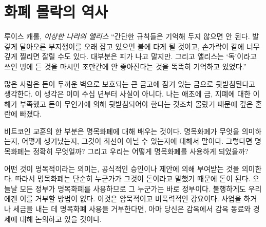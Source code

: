 \chapter{화폐 몰락의 역사}
\label{les:12}

\begin{chapquote}{루이스 캐롤, \textit{이상한 나라의 앨리스}}
	\enquote{간단한 규칙들은 기억해 두지 않으면 안 된다.
		발갛게 달아오른 부지깽이를 오래 잡고 있으면 불에 타게 될 것이고, 
		손가락이 칼에 너무 깊게 찔리면 잘릴 수도 있다. 
		대부분은 피가 나고 말지만. 
		그리고 앨리스는 ‘독’이라고 쓰인 병에 든 것을 마시면 
		조만간에 안 좋아진다는 것을 똑똑히 기억하고 있었다.}
\end{chapquote}

\begin{comment}
	Many people think that money is backed by gold, which is locked away in
	big vaults, protected by thick
	walls. This ceased to be true many decades ago. I am not sure what I
	thought, since I was in much deeper trouble, having virtually no
	understanding of gold, paper money, or why it would need to be backed by
	something in the first place.
\end{comment}
많은 사람은 돈이 두꺼운 벽으로 보호되는 큰 금고에 잠겨 있는 금으로 뒷받침된다고 생각한다. 
이 생각은 이미 수십 년부터 사실이 아니다.
나는 애초에 금, 지폐에 대한 이해가 부족했고
돈이 무언가에 의해 뒷받침되어야 한다는 것조차 몰랐기 때문에 깊은 혼란에 빠졌다.
\begin{comment}
	One part of learning about Bitcoin is learning about fiat money: what it
	means, how it came to be, and why it might not be the best idea we ever
	had. So, what exactly is fiat money? And how did we end up using it?
\end{comment}
비트코인 교훈의 한 부분은 명목화폐에 대해 배우는 것이다. 
명목화폐가 무엇을 의미하는지, 어떻게 생겨났는지, 
그것이 최선이 아닐 수 있는지에 대해서 말이다. 
그렇다면 명목화폐는 정확히 무엇일까? 
그리고 우리는 어떻게 명목화폐를 사용하게 되었을까?

\begin{comment}
	If something is imposed by \textit{fiat}, it simply means that it is imposed by
	formal authorization or proposition. Thus, fiat money is money simply
	because \textit{someone} says that it is money. Since all governments use fiat
	currency today, this someone is \textit{your} government. Unfortunately, you
	are not \textit{free} to disagree with this value proposition. You will quickly
	feel that this proposition is everything but non-violent. If you refuse
	to use this paper currency to do business and pay taxes the only people
	you will be able to discuss economics with will be your cellmates.
\end{comment}
어떤 것이 명목적이라는 의미는, 공식적인 승인이나 제안에 의해 부여받는 것을 의미한다. 
따라서 명목화폐는 단순히 누군가가 그것이 돈이라고 말했기 때문에 돈이 된다. 
오늘날 모든 정부가 명목화폐를 사용하므로 그 누군가는 바로 정부이다. 
불행하게도 우리에겐 이를 거부할 방법이 없다.
이것은 암묵적이고 비폭력적인 강요이다.
사업을 하거나 세금을 내는 데 명목화폐 사용을 거부한다면,
아마 당신은 감옥에서 감옥 동료와 경제에 대해 논의하고 있을 것이다.

